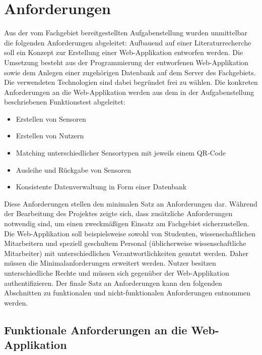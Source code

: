 \documentclass[
]{article}
\providecommand{\tightlist}{%
  \setlength{\itemsep}{0pt}\setlength{\parskip}{0pt}}
\begin{document}
\hypertarget{requirements}{%
\section{Anforderungen}\label{requirements}}

Aus der vom Fachgebiet bereitgestellten Aufgabenstellung wurden unmittelbar die folgenden Anforderungen abgeleitet: Aufbauend auf einer Literaturrecherche soll ein Konzept zur Erstellung einer Web-Applikation entworfen werden. Die Umsetzung besteht aus der Programmierung der entworfenen Web-Applikation sowie dem Anlegen einer zugehörigen Datenbank auf dem Server des Fachgebiets. Die verwendeten Technologien sind dabei begründet frei zu wählen. Die konkreten Anforderungen an die Web-Applikation werden aus dem in der Aufgabenstellung beschriebenen Funktionstest abgeleitet:

\begin{itemize}
\tightlist
\item
  Erstellen von Sensoren
\item
  Erstellen von Nutzern
\item
  Matching unterschiedlicher Sensortypen mit jeweils einem QR-Code
\item
  Ausleihe und Rückgabe von Sensoren
\item
  Konsistente Datenverwaltung in Form einer Datenbank
\end{itemize}

Diese Anforderungen stellen den minimalen Satz an Anforderungen dar. Während der Bearbeitung des Projektes zeigte sich, dass zusätzliche Anforderungen notwendig sind, um einen zweckmäßigen Einsatz am Fachgebiet sicherzustellen. Die Web-Applikation soll beispielsweise sowohl von Studenten, wissenschaftlichen Mitarbeitern und speziell geschultem Personal (üblicherweise wissenschaftliche Mitarbeiter) mit unterschiedlichen Verantwortlichkeiten genutzt werden. Daher müssen die Minimalanforderungen erweitert werden. Nutzer besitzen unterschiedliche Rechte und müssen sich gegenüber der Web-Applikation authentifizieren. Der finale Satz an Anforderungen kann den folgenden Abschnitten zu funktionalen und nicht-funktionalen Anforderungen entnommen werden.

\hypertarget{funktionale-anforderungen-an-die-web-applikation}{%
\subsection{Funktionale Anforderungen an die Web-Applikation}\label{funktionale-anforderungen-an-die-web-applikation}}
\end{document}
